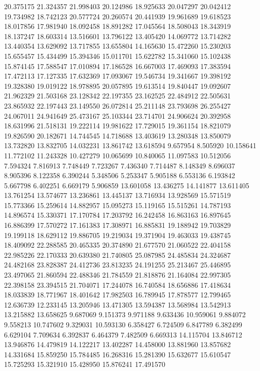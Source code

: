 20.375175
21.324357
21.998403
20.124986
18.925633
20.047297
20.042412
19.734982
18.742123
20.577724
20.260574
20.441939
19.961689
19.618523
18.017856
17.981940
18.092458
18.891282
17.045564
18.508043
18.343919
18.137247
18.603314
13.516601
13.796122
13.405420
14.069772
13.714282
13.440354
13.629092
13.717855
13.655804
14.165630
15.472260
15.230203
15.655457
15.434499
15.394346
15.011701
15.622782
15.341060
15.102438
15.874145
17.588547
17.010894
17.186528
16.667003
17.469093
17.383594
17.472113
17.127335
17.632369
17.093067
19.546734
19.341667
19.398192
19.328380
19.019122
18.978895
20.057895
19.613514
19.840447
19.092607
21.962329
21.503168
23.128342
22.197355
23.162525
22.484912
22.505631
23.865932
22.197443
23.149550
26.072814
25.211148
23.793698
26.255427
24.067011
24.941649
25.473167
25.103344
23.714701
24.906624
20.392958
18.631996
21.518131
19.222114
19.981622
17.729015
19.361154
18.821079
19.826590
20.182671
14.744545
14.718688
13.403619
13.280348
13.850079
13.732820
13.832705
14.032231
13.861742
13.618594
9.657954
8.505920
10.158641
11.772102
11.243328
10.427279
10.065699
10.840065
11.097583
10.512056
7.594324
7.816913
7.748449
7.723267
7.436340
7.714487
8.148349
8.696037
8.905396
8.122358
6.390244
5.348506
5.253347
5.905188
6.553136
6.193842
5.667798
6.402251
6.669179
5.906859
13.601058
13.436275
14.141877
13.611405
13.761254
13.574677
13.236861
13.445137
13.716934
13.928569
15.571519
15.773366
15.259614
14.882957
15.095273
15.119165
15.515261
14.787193
14.896574
15.330371
17.170784
17.203792
16.242458
16.863163
16.897645
16.886399
17.570272
17.161383
17.308971
16.885831
19.188942
19.703829
19.199118
18.629112
19.886705
19.219034
19.371904
19.463033
19.438745
18.409092
22.288585
20.465335
20.374890
21.677570
21.060522
22.404158
22.985226
22.170333
20.639380
21.740805
25.087985
24.485834
24.324687
24.482168
23.828387
24.412736
23.813235
24.191255
25.213467
25.446895
23.497065
21.860594
22.488346
21.784559
21.818876
21.164084
22.997305
22.398158
23.394515
21.704071
17.244078
16.740584
18.656886
17.418634
18.033839
18.771967
18.401642
17.982503
16.789945
17.878577
12.799465
12.636739
12.233145
13.205946
13.471305
13.594387
13.568984
13.542913
13.215882
13.658625
9.687069
9.151373
9.971188
9.633436
10.959061
9.884072
9.558213
10.747602
9.329031
10.593130
6.358427
6.724509
6.847789
6.382499
6.629104
7.709634
6.392837
6.464379
7.482509
6.669313
14.115704
13.846712
13.946876
14.479819
14.122217
13.402287
14.458000
13.881960
13.857682
14.331684
15.859250
15.784485
16.268316
15.281390
15.632677
15.610547
15.725293
15.321910
15.428950
15.876241
17.491570
